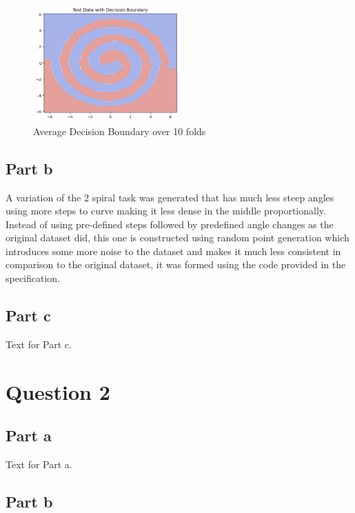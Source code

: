 \documentclass[runningheads]{llncs}
\begin{document}
\begin{figure}[!htb]
  \centering
  \includegraphics[width=0.5\textwidth]{Question1Images/1AFinalFFNNOutput.png}
  \caption{Average Decision Boundary over 10 folds}
  \label{fig:FirstFFNNDecision}
\end{figure}

\subsection{Part b}
A variation of the 2 spiral task was generated that has much less steep angles using more steps to curve making it less dense in the middle proportionally. Instead of using pre-defined steps followed by predefined angle changes as the original dataset did, this one is constructed using random point generation which introduces some more noise to the dataset and makes it much less consistent in comparison to the original dataset, it was formed using the code provided in the specification. \cite{45deg}

\subsection{Part c}

Text for Part c.

\section{Question 2}

\subsection{Part a}

Text for Part a.

\subsection{Part b}
\end{document}
